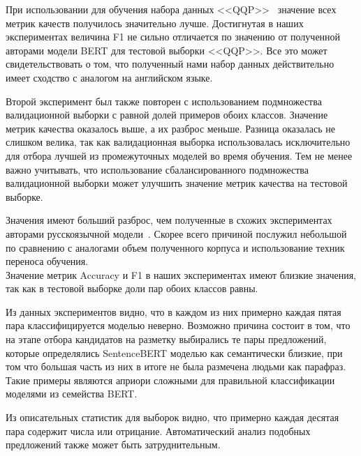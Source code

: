 \documentclass[a4paper,14pt]{extarticle}
\begin{document}
    При использовании для обучения набора данных \mbox{<<QQP>>}~\autocite{iyer_csernai_dandekar_2017} значение всех метрик качеств получилось значительно лучше.
    Достигнутая в наших экспериментах величина F1 не сильно отличается по значению от полученной~\autocite{devlin2018bert} авторами модели \mbox{BERT} для тестовой выборки \mbox{<<QQP>>}.
    Все это может свидетельствовать о том, что полученный нами набор данных действительно имеет сходство с аналогом на английском языке.
    
    Второй эксперимент был также повторен с использованием подмножества валидационной выборки с равной долей примеров обоих классов.
    Значение метрик качества оказалось выше, а их разброс меньше.
    Разница оказалась не слишком велика, так как валидационная выборка использовалась исключительно для отбора лучшей из промежуточных моделей во время обучения.
    Тем не менее важно учитывать, что использование сбалансированного подмножества валидационной выборки может улучшить значение метрик качества на тестовой выборке.
    
    Значения имеют больший разброс, чем полученные в схожих экспериментах авторами русскоязычной модели~\autocite{kuratov2019adaptation}.
    Скорее всего причиной послужил небольшой по сравнению с аналогами объем полученного корпуса и использование техник переноса обучения.\\
    Значение метрик Accuracy и F1 в наших экспериментах имеют близкие значения, так как в тестовой выборке доли пар обоих классов равны.
    
    Из данных экспериментов видно, что в каждом из них примерно каждая пятая пара классифицируется моделью неверно.
    Возможно причина состоит в том, что на этапе отбора кандидатов на разметку выбирались те пары предложений, которые определялись \mbox{SentenceBERT} моделью как семантически близкие, при том что большая часть из них в итоге не была размечена людьми как парафраз.
    Такие примеры являются априори сложными для правильной классификации моделями из семейства \mbox{BERT}.
\begin{comment}
    Это предположение косвенно подтверждается тем, что в ряде экспериментов значение метрики Accuracy на тестовой выборке было больше, чем на валидационной, в которой больше доля примеров отрицательного класса.
\end{comment}
    Из описательных статистик для выборок видно, что примерно каждая десятая пара содержит числа или отрицание.
    Автоматический анализ подобных предложений также может быть затруднительным.
    
\end{document}
